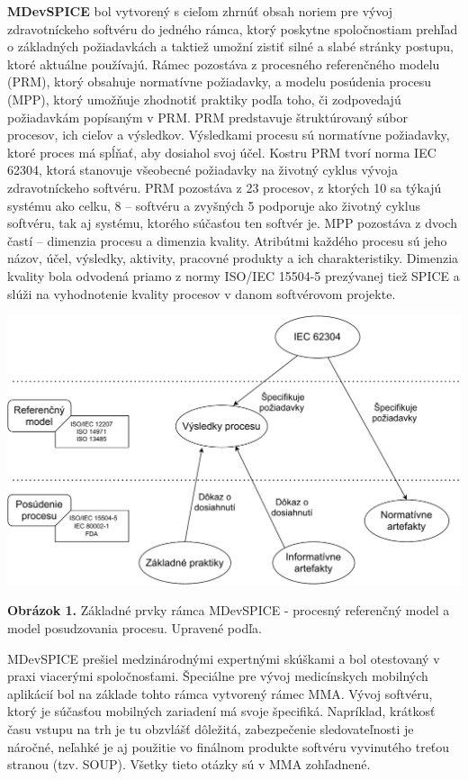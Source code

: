 \documentclass[10pt,twoside,slovak,a4paper]{article}
\begin{document}
\textbf{MDevSPICE} bol vytvorený s cieľom zhrnúť obsah noriem pre vývoj zdravotníckeho softvéru do jedného rámca, ktorý poskytne spoločnostiam prehľad o základných požiadavkách a taktiež umožní zistiť silné a slabé stránky postupu, ktoré aktuálne používajú. Rámec pozostáva z procesného referenčného modelu (PRM), ktorý obsahuje normatívne požiadavky, a modelu posúdenia procesu (MPP), ktorý umožňuje zhodnotiť praktiky podľa toho, či zodpovedajú požiadavkám popísaným v PRM. PRM predstavuje štruktúrovaný súbor procesov, ich cieľov a výsledkov. Výsledkami procesu sú normatívne požiadavky, ktoré proces má spĺňať, aby dosiahol svoj účel. Kostru PRM tvorí norma IEC 62304, ktorá stanovuje všeobecné požiadavky na životný cyklus vývoja zdravotníckeho softvéru. PRM pozostáva z 23 procesov, z ktorých 10 sa týkajú systému ako celku, 8 – softvéru a zvyšných 5 podporuje ako životný cyklus softvéru, tak aj systému, ktorého súčasťou ten softvér je. MPP pozostáva z dvoch častí – dimenzia procesu a dimenzia kvality. Atribútmi každého procesu sú jeho názov, účel, výsledky, aktivity, pracovné produkty a ich charakteristiky. Dimenzia kvality bola odvodená priamo z normy ISO/IEC 15504-5 prezývanej tiež SPICE a slúži na vyhodnotenie kvality procesov v danom softvérovom projekte\cite{ramecmd}.

\begin{center}
\includegraphics[scale=0.5]{MDevSPICE.pdf}
\end{center}
\textbf{Obrázok 1.} Základné prvky rámca MDevSPICE - procesný referenčný model a model posudzovania procesu. Upravené podľa\cite{ramecmd}.
\medskip

MDevSPICE prešiel medzinárodnými expertnými skúškami a bol otestovaný v praxi viacerými spoločnosťami. Špeciálne pre vývoj medicínskych mobilných aplikácií bol na základe tohto rámca vytvorený rámec MMA. Vývoj softvéru, ktorý je súčasťou mobilných zariadení má svoje špecifiká. Napríklad, krátkosť času vstupu na trh je tu obzvlášť dôležitá, zabezpečenie sledovateľnosti je náročné, neľahké je aj použitie vo finálnom produkte softvéru vyvinutého treťou stranou (tzv. SOUP). Všetky tieto otázky sú v MMA zohľadnené\cite{mobileMed}.
\end{document}
